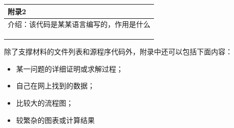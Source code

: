 \documentclass{my_paper}
\begin{document}
\begin{table}[htbp]
    \centering
    \begin{tabular}{|p{14.0cm}|}
    \hline
    \textbf{附录2} \\ %
    \hline
    介绍：该代码是某某语言编写的，作用是什么   \\ 
    \\
    \\
    \\
    \hline
    \end{tabular}
\end{table}

除了支撑材料的文件列表和源程序代码外，附录中还可以包括下面内容：
\begin{itemize}
\item 某一问题的详细证明或求解过程；
\item 自己在网上找到的数据；
\item 比较大的流程图；
\item 较繁杂的图表或计算结果
\end{itemize}
\end{document}
